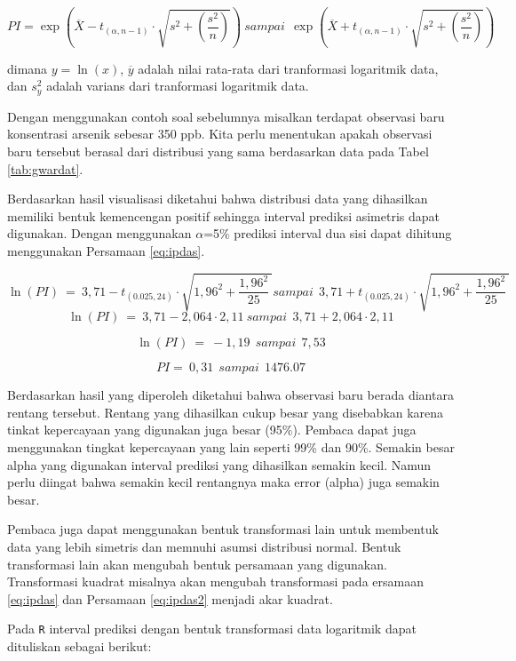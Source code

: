 \documentclass[]{book}
\begin{document}
\begin{equation}
  PI=\exp\left(\overline{X}-t_{\left(\alpha,n-1\right)}\cdot\sqrt{s^2+\left(\frac{s^2}{n}\right)}\right)\ sampai\ \ \exp\left(\overline{X}+t_{\left(\alpha,n-1\right)}\cdot\sqrt{s^2+\left(\frac{s^2}{n}\right)}\right)
  \label{eq:ipdas2}
\end{equation}

dimana \(y=\ln{(x)}\), \(\overline{y}\) adalah nilai rata-rata dari
tranformasi logaritmik data, dan \(s^2_y\) adalah varians dari
tranformasi logaritmik data.

Dengan menggunakan contoh soal sebelumnya misalkan terdapat observasi
baru konsentrasi arsenik sebesar 350 ppb. Kita perlu menentukan apakah
observasi baru tersebut berasal dari distribusi yang sama berdasarkan
data pada Tabel \ref{tab:gwardat}.

Berdasarkan hasil visualisasi diketahui bahwa distribusi data yang
dihasilkan memiliki bentuk kemencengan positif sehingga interval
prediksi asimetris dapat digunakan. Dengan menggunakan \(\alpha\)=5\%
prediksi interval dua sisi dapat dihitung menggunakan Persamaan
\eqref{eq:ipdas}.

\[
\ln\left(PI\right)\ =\ 3,71-t_{\left(0.025,24\right)}\cdot\sqrt{1,96^2+\frac{1,96^2}{25}\ }sampai\ \ 3,71+t_{\left(0.025,24\right)}\cdot\sqrt{1,96^2+\frac{1,96^2}{25}\ }
\] \[
\ln\left(PI\right)\ =\ 3,71-2,064\cdot2,11\ sampai\ \ 3,71+2,064\cdot2,11
\]

\[
\ln\left(PI\right)\ =\ -1,19\ \ sampai\ \ 7,53
\]

\[
PI=\ 0,31\ \ sampai\ \ 1476.07
\]

Berdasarkan hasil yang diperoleh diketahui bahwa observasi baru berada
diantara rentang tersebut. Rentang yang dihasilkan cukup besar yang
disebabkan karena tinkat kepercayaan yang digunakan juga besar (95\%).
Pembaca dapat juga menggunakan tingkat kepercayaan yang lain seperti
99\% dan 90\%. Semakin besar alpha yang digunakan interval prediksi yang
dihasilkan semakin kecil. Namun perlu diingat bahwa semakin kecil
rentangnya maka error (alpha) juga semakin besar.

Pembaca juga dapat menggunakan bentuk transformasi lain untuk membentuk
data yang lebih simetris dan memnuhi asumsi distribusi normal. Bentuk
transformasi lain akan mengubah bentuk persamaan yang digunakan.
Transformasi kuadrat misalnya akan mengubah transformasi pada ersamaan
\eqref{eq:ipdas} dan Persamaan \eqref{eq:ipdas2} menjadi akar kuadrat.

Pada \texttt{R} interval prediksi dengan bentuk transformasi data
logaritmik dapat dituliskan sebagai berikut:
\end{document}
